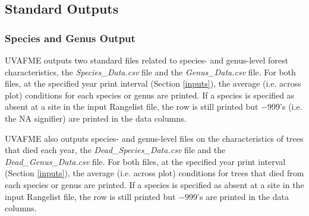 \documentclass[a4paper, 12pt] {article}
\begin{document}
\subsection{Standard Outputs}

\subsubsection{Species and Genus Output}

UVAFME outputs two standard files related to species- and genus-level forest characteristics, the \textit{Species\_Data.csv} file and the \textit{Genus\_Data.csv} file. For both files, at the specified year print interval (Section \ref{inputs}), the average (i.e. across plot) conditions for each species or genus are printed. If a species is specified as absent at a site in the input Rangelist file, the row is still printed but $-999$'s (i.e. the NA signifier) are printed in the data columns.

UVAFME also outputs  species- and genus-level files on the characteristics of trees that died each year, the \textit{Dead\_Species\_Data.csv} file and the \textit{Dead\_Genus\_Data.csv} file. For both files, at the specified year print interval (Section \ref{inputs}), the average (i.e. across plot) conditions for trees that died from each species or genus are printed. If a species is specified as absent at a site in the input Rangelist file, the row is still printed but $-999$'s are printed in the data columns.
\end{document}
